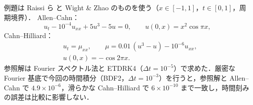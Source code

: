 \documentclass[uplatex,dvipdfmx,a4paper,10pt,twocolumn]{jsarticle}
\theoremstyle{definition}
\begin{document}
例題は Raissi ら \cite{raissi} と Wight \& Zhao \cite{wight} のものを使う（$x\in[-1,1]$，$t\in[0,1]$，周期境界）．
Allen--Cahn：
\begin{equation}
  u_t-10^{-4}u_{xx}+5u^3-5u=0,\qquad u(0,x)=x^2\cos\pi x,
\end{equation}
Cahn--Hilliard：
\begin{equation}
\begin{aligned}
  &u_t=\mu_{xx},\qquad \mu=0.01\,(u^3-u)-10^{-6}u_{xx},\\
  &u(0,x)=-\cos2\pi x.
\end{aligned}
\end{equation}
参照解は Fourier スペクトル法と ETDRK4（$\Delta t=10^{-5}$）で求めた．厳密な Fourier 基底で今回の時間積分（BDF2，$\Delta t=10^{-3}$）を行うと，参照解と Allen--Cahn で $4.9\times10^{-6}$，滑らかな Cahn--Hilliard で $6\times10^{-10}$ まで一致し，時間刻みの誤差は比較に影響しない．

\begin{table}[t]
\centering\small\setlength{\tabcolsep}{3pt}
\caption{$t=1$ での相対 $L_2$ 誤差}
\end{table}
\end{document}
